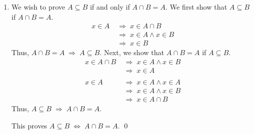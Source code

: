 \documentclass[10pt]{article}
\begin{document}
\begin{enumerate}
                \item
                We wish to prove $A \subseteq B$ if and only if $A \cap B = A$. We first show that $A \subseteq B$ if $A \cap B = A$.
                \begin{align*}
                        x \in A
                                \;&\Rightarrow\; x \in A \cap B                                 \tag{$A \cap B = A$}\\
                                \;&\Rightarrow\; x \in A \land x \in B\\
                                \;&\Rightarrow\; x \in B
                \end{align*}
                Thus, $A \cap B = A \;\Rightarrow\; A \subseteq B$. Next, we show that $A \cap B = A$ if $A \subseteq B$.
                \begin{align*}
                        x \in A \cap B
                                \;&\Rightarrow\; x \in A \land x \in B\\
                                \;&\Rightarrow\; x \in A\\\\
                        x \in A
                                \;&\Rightarrow\; x \in A \land x \in A\\
                                \;&\Rightarrow\; x \in A \land x \in B                          \tag{$A \subseteq B$}\\
                                \;&\Rightarrow\; x \in A \cap B
                \end{align*}
                Thus, $A \subseteq B \;\Rightarrow\; A \cap B = A$.
                
                This proves $A \subseteq B \;\Leftrightarrow\; A \cap B = A$. \qed



\end{enumerate}
\end{document}
